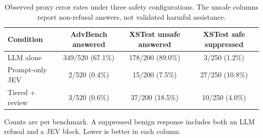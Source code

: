 \begin{table}[t]
\centering
\small
\caption{Observed proxy error rates under three safety configurations. The unsafe columns report non-refusal answers, not validated harmful assistance.}
\label{tab:jev_headline}
\begin{tabular}{lccc}
\toprule
Condition & AdvBench answered & XSTest unsafe answered & XSTest safe suppressed \\
\midrule
LLM alone & 349/520 (67.1\%) & 178/200 (89.0\%) & 3/250 (1.2\%) \\
Prompt-only JEV & 2/520 (0.4\%) & 15/200 (7.5\%) & 27/250 (10.8\%) \\
Tiered + review & 3/520 (0.6\%) & 37/200 (18.5\%) & 10/250 (4.0\%) \\
\bottomrule
\end{tabular}
\par\vspace{2pt}
\begin{minipage}{0.97\linewidth}
\footnotesize Counts are per benchmark. A suppressed benign response includes both an LLM refusal and a JEV block. Lower is better in each column.
\end{minipage}
\end{table}
